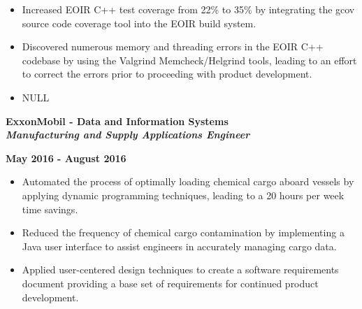 \documentclass[10pt,letterpaper]{article}
\begin{document}
\begin{itemize}[noitemsep,topsep=0pt]
        \setlength\itemsep{-0.10em}
        \item Increased EOIR C++ test coverage from 22\% to 35\% by integrating the gcov
              source code coverage tool into the EOIR build system.
        \item Discovered numerous memory and threading errors in the EOIR C++ codebase
              by using the Valgrind Memcheck/Helgrind tools, leading to an effort to correct
              the errors prior to proceeding with product development.
        \item NULL
\end{itemize}

\medskip

\begin{minipage}[t]{0.53\textwidth}
        \begin{flushleft}
                \textbf{ExxonMobil - Data and Information Systems}\\
                \textbf{\textit{Manufacturing and Supply Applications Engineer}}\\
        \end{flushleft}
\end{minipage}
\begin{minipage}[t]{0.44\textwidth}
        \begin{flushright}
                \textbf{May 2016 - August 2016}
        \end{flushright}
\end{minipage}

\begin{itemize}[noitemsep,topsep=0pt]
        \setlength\itemsep{-0.10em}
        \item Automated the process of optimally loading chemical cargo aboard
              vessels by applying dynamic programming techniques, leading to a 20
              hours per week time savings.
        \item Reduced the frequency of chemical cargo contamination by implementing
              a Java user interface to assist engineers in accurately managing cargo data.
        \item Applied user-centered design techniques to create a software
              requirements document providing a base set of requirements for continued
              product development.
\end{itemize}

\medskip
\end{document}

